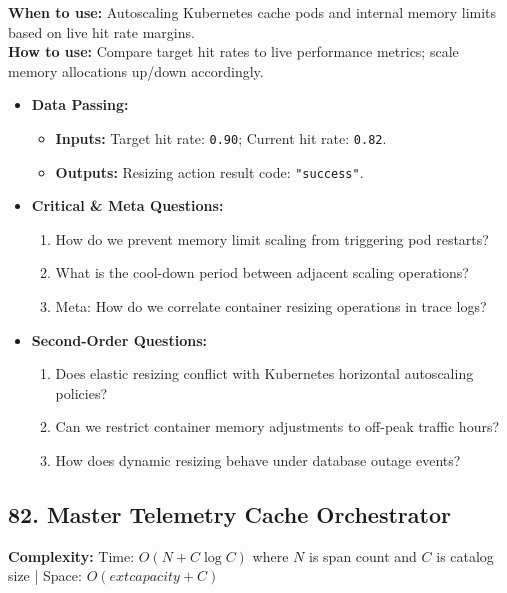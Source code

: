 \documentclass[11pt,a4paper]{article}
\theoremstyle{definition}
\begin{document}
\noindent
\textbf{When to use:} Autoscaling Kubernetes cache pods and internal memory limits based on live hit rate margins.\\
\textbf{How to use:} Compare target hit rates to live performance metrics; scale memory allocations up/down accordingly.
\begin{itemize}[leftmargin=*]
  \item[] \textbf{Data Passing:}
    \begin{itemize}
      \item \textbf{Inputs:} Target hit rate: \texttt{0.90}; Current hit rate: \texttt{0.82}.
      \item \textbf{Outputs:} Resizing action result code: \texttt{"success"}.
    \end{itemize}
  \item[] \textbf{Critical \& Meta Questions:}
  \begin{enumerate}
    \item How do we prevent memory limit scaling from triggering pod restarts?
    \item What is the cool-down period between adjacent scaling operations?
    \item Meta: How do we correlate container resizing operations in trace logs?
  \end{enumerate}
  \item[] \textbf{Second-Order Questions:}
  \begin{enumerate}
    \item Does elastic resizing conflict with Kubernetes horizontal autoscaling policies?
    \item Can we restrict container memory adjustments to off-peak traffic hours?
    \item How does dynamic resizing behave under database outage events?
  \end{enumerate}
\end{itemize}
\medskip

\clearpage
\subsection{82. Master Telemetry Cache Orchestrator}


\noindent
\textbf{Complexity:} Time: $O(N + C \log C)$ where $N$ is span count and $C$ is catalog size | Space: $O(	ext{capacity} + C)$
\smallskip
\end{document}
